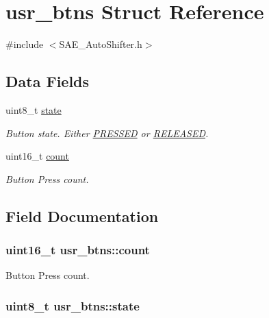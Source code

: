 \hypertarget{structusr__btns}{\section{usr\-\_\-btns Struct Reference}
\label{structusr__btns}
}


{\ttfamily \#include $<$S\-A\-E\-\_\-\-Auto\-Shifter.\-h$>$}

\subsection*{Data Fields}
\begin{DoxyCompactItemize}
\item 
uint8\-\_\-t \hyperlink{structusr__btns_a68cc7345efa9f7b1f691fcc558c4ff2b}{state}
\begin{DoxyCompactList}\small\item\em Button state. Either \hyperlink{defines_8h_a654adff3c664f27f0b29c24af818dd26}{P\-R\-E\-S\-S\-E\-D} or \hyperlink{defines_8h_ad74b7f5218b46c8332cd531df7178d45}{R\-E\-L\-E\-A\-S\-E\-D}. \end{DoxyCompactList}\item 
uint16\-\_\-t \hyperlink{structusr__btns_a854c0e58f6c0c68c5ef78243811afaf5}{count}
\begin{DoxyCompactList}\small\item\em Button Press count. \end{DoxyCompactList}\end{DoxyCompactItemize}


\subsection{Field Documentation}
\hypertarget{structusr__btns_a854c0e58f6c0c68c5ef78243811afaf5}{
\subsubsection[{count}]{\setlength{\rightskip}{0pt plus 5cm}uint16\-\_\-t {\bf usr\-\_\-btns\-::count}}}\label{structusr__btns_a854c0e58f6c0c68c5ef78243811afaf5}


Button Press count. 

\hypertarget{structusr__btns_a68cc7345efa9f7b1f691fcc558c4ff2b}{
\subsubsection[{state}]{\setlength{\rightskip}{0pt plus 5cm}uint8\-\_\-t {\bf usr\-\_\-btns\-::state}}}\label{structusr__btns_a68cc7345efa9f7b1f691fcc558c4ff2b}


